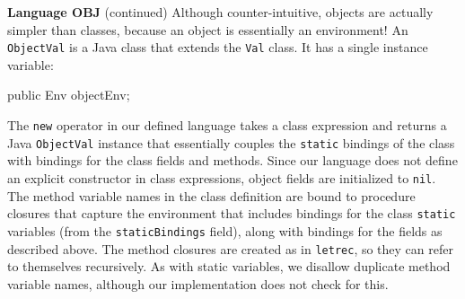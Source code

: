 \begin{minipage}[t]{\sw}
\slidenumber
\LARGE
{\bf Language OBJ} (continued)\exx
Although counter-intuitive,
objects are actually simpler than classes,
because an object is essentially an environment!\exx
An \verb'ObjectVal' is a Java class
that extends the \verb'Val' class.
It has a single instance variable:
\begin{qv}
    public Env objectEnv;
\end{qv}
The \verb'new' operator in our defined language
takes a class expression and returns
a Java \verb'ObjectVal' instance
that essentially couples the \verb'static' bindings of the class
with bindings for the class fields and methods.
Since our language does not define
an explicit constructor in class expressions,
object fields are initialized to \verb'nil'.
The method variable names in the class definition are bound
to procedure closures that capture the environment
that includes bindings for the class \verb'static' variables
(from the \verb'staticBindings' field), 
along with bindings for the fields as described above.
The method closures are created as in \verb'letrec',
so they can refer to themselves recursively.
As with static variables,
we disallow duplicate method variable names,
although our implementation does not check for this.\exx
\end{minipage}
